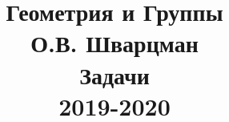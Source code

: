 \documentclass[fleqn]{article}
\title{Геометрия и Группы \\ О.В. Шварцман \\ Задачи \\ 2019-2020}
\date{}
\begin{document}
	\maketitle
	\pagebreak	
	\tableofcontents
	
	
	
\end{document}

